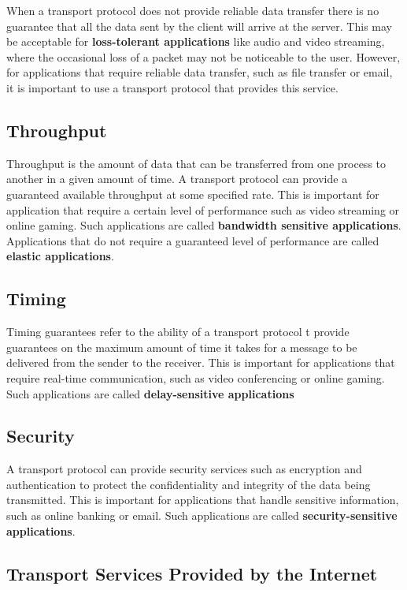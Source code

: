 \documentclass[12pt letter]{report}
\begin{document}
When a transport protocol does not provide reliable data transfer
there is no guarantee that all the data sent by the client will
arrive at the server. This may be acceptable for \textbf{loss-tolerant
applications} like audio and video streaming, where the occasional
loss of a packet may not be noticeable to the user. However, for
applications that require reliable data transfer, such as file
transfer or email, it is important to use a transport protocol that
provides this service.

\subsection{Throughput}

Throughput is the amount of data that can be transferred from one
process to another in a given amount of time. A transport protocol
can provide a guaranteed available throughput at some specified rate.
This is important for application that require a certain level of
performance such as video streaming or online gaming. Such
applications are called \textbf{bandwidth sensitive applications}.
Applications that do not require a guaranteed level of performance
are called \textbf{elastic applications}.

\subsection{Timing}

Timing guarantees refer to the ability of a transport protocol t
provide guarantees on the maximum amount of time it takes for a
message to be delivered from the sender to the receiver. This is
important for applications that require real-time communication, such
as video conferencing or online gaming. Such applications are called
\textbf{delay-sensitive applications}

\subsection{Security}

A transport protocol can provide security services such as encryption
and authentication to protect the confidentiality and integrity of the data
being transmitted. This is important for applications that handle
sensitive information, such as online banking or email. Such
applications are called \textbf{security-sensitive applications}.

\subsection{Transport Services Provided by the Internet}
\end{document}
